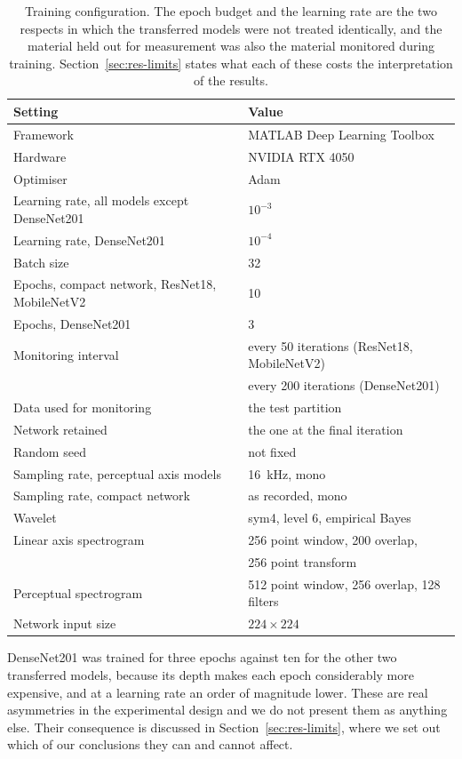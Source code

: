 \documentclass[pdflatex,sn-mathphys-num]{sn-jnl}
\begin{document}
\begin{table}[t]
\centering
\footnotesize
\caption{Training configuration. The epoch budget and the learning rate are
the two respects in which the transferred models were not treated
identically, and the material held out for measurement was also the material
monitored during training. Section~\ref{sec:res-limits} states what each of
these costs the interpretation of the results.}
\label{tab:train}
\begin{tabular}{@{}ll@{}}
\toprule
Setting & Value \\
\midrule
Framework & MATLAB Deep Learning Toolbox \\
Hardware & NVIDIA RTX 4050 \\
Optimiser & Adam \\
Learning rate, all models except DenseNet201 & $10^{-3}$ \\
Learning rate, DenseNet201 & $10^{-4}$ \\
Batch size & 32 \\
Epochs, compact network, ResNet18, MobileNetV2 & 10 \\
Epochs, DenseNet201 & 3 \\
Monitoring interval & every 50 iterations (ResNet18, MobileNetV2) \\
 & every 200 iterations (DenseNet201) \\
Data used for monitoring & the test partition \\
Network retained & the one at the final iteration \\
Random seed & not fixed \\
Sampling rate, perceptual axis models & 16~kHz, mono \\
Sampling rate, compact network & as recorded, mono \\
Wavelet & sym4, level 6, empirical Bayes \\
Linear axis spectrogram & 256 point window, 200 overlap, \\
 & 256 point transform \\
Perceptual spectrogram & 512 point window, 256 overlap, 128 filters \\
Network input size & $224 \times 224$ \\
\bottomrule
\end{tabular}
\end{table}

DenseNet201 was trained for three epochs against ten for the other two
transferred models, because its depth makes each epoch considerably more
expensive, and at a learning rate an order of magnitude lower. These are real
asymmetries in the experimental design and we do not present them as anything
else. Their consequence is discussed in Section~\ref{sec:res-limits}, where we
set out which of our conclusions they can and cannot affect.
\end{document}
